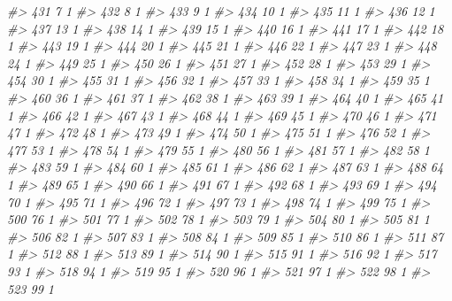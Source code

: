 \documentclass[]{article}
\newenvironment{Shaded}{\begin{snugshade}}{\end{snugshade}}
\newcommand{\CommentTok}[1]{\textcolor[rgb]{0.56,0.35,0.01}{\textit{#1}}}
\begin{document}
\begin{Shaded}
\begin{Highlighting}[]
\CommentTok{#> 431    7  1}
\CommentTok{#> 432    8  1}
\CommentTok{#> 433    9  1}
\CommentTok{#> 434   10  1}
\CommentTok{#> 435   11  1}
\CommentTok{#> 436   12  1}
\CommentTok{#> 437   13  1}
\CommentTok{#> 438   14  1}
\CommentTok{#> 439   15  1}
\CommentTok{#> 440   16  1}
\CommentTok{#> 441   17  1}
\CommentTok{#> 442   18  1}
\CommentTok{#> 443   19  1}
\CommentTok{#> 444   20  1}
\CommentTok{#> 445   21  1}
\CommentTok{#> 446   22  1}
\CommentTok{#> 447   23  1}
\CommentTok{#> 448   24  1}
\CommentTok{#> 449   25  1}
\CommentTok{#> 450   26  1}
\CommentTok{#> 451   27  1}
\CommentTok{#> 452   28  1}
\CommentTok{#> 453   29  1}
\CommentTok{#> 454   30  1}
\CommentTok{#> 455   31  1}
\CommentTok{#> 456   32  1}
\CommentTok{#> 457   33  1}
\CommentTok{#> 458   34  1}
\CommentTok{#> 459   35  1}
\CommentTok{#> 460   36  1}
\CommentTok{#> 461   37  1}
\CommentTok{#> 462   38  1}
\CommentTok{#> 463   39  1}
\CommentTok{#> 464   40  1}
\CommentTok{#> 465   41  1}
\CommentTok{#> 466   42  1}
\CommentTok{#> 467   43  1}
\CommentTok{#> 468   44  1}
\CommentTok{#> 469   45  1}
\CommentTok{#> 470   46  1}
\CommentTok{#> 471   47  1}
\CommentTok{#> 472   48  1}
\CommentTok{#> 473   49  1}
\CommentTok{#> 474   50  1}
\CommentTok{#> 475   51  1}
\CommentTok{#> 476   52  1}
\CommentTok{#> 477   53  1}
\CommentTok{#> 478   54  1}
\CommentTok{#> 479   55  1}
\CommentTok{#> 480   56  1}
\CommentTok{#> 481   57  1}
\CommentTok{#> 482   58  1}
\CommentTok{#> 483   59  1}
\CommentTok{#> 484   60  1}
\CommentTok{#> 485   61  1}
\CommentTok{#> 486   62  1}
\CommentTok{#> 487   63  1}
\CommentTok{#> 488   64  1}
\CommentTok{#> 489   65  1}
\CommentTok{#> 490   66  1}
\CommentTok{#> 491   67  1}
\CommentTok{#> 492   68  1}
\CommentTok{#> 493   69  1}
\CommentTok{#> 494   70  1}
\CommentTok{#> 495   71  1}
\CommentTok{#> 496   72  1}
\CommentTok{#> 497   73  1}
\CommentTok{#> 498   74  1}
\CommentTok{#> 499   75  1}
\CommentTok{#> 500   76  1}
\CommentTok{#> 501   77  1}
\CommentTok{#> 502   78  1}
\CommentTok{#> 503   79  1}
\CommentTok{#> 504   80  1}
\CommentTok{#> 505   81  1}
\CommentTok{#> 506   82  1}
\CommentTok{#> 507   83  1}
\CommentTok{#> 508   84  1}
\CommentTok{#> 509   85  1}
\CommentTok{#> 510   86  1}
\CommentTok{#> 511   87  1}
\CommentTok{#> 512   88  1}
\CommentTok{#> 513   89  1}
\CommentTok{#> 514   90  1}
\CommentTok{#> 515   91  1}
\CommentTok{#> 516   92  1}
\CommentTok{#> 517   93  1}
\CommentTok{#> 518   94  1}
\CommentTok{#> 519   95  1}
\CommentTok{#> 520   96  1}
\CommentTok{#> 521   97  1}
\CommentTok{#> 522   98  1}
\CommentTok{#> 523   99  1}

\end{Highlighting}
\end{Shaded}
\end{document}
